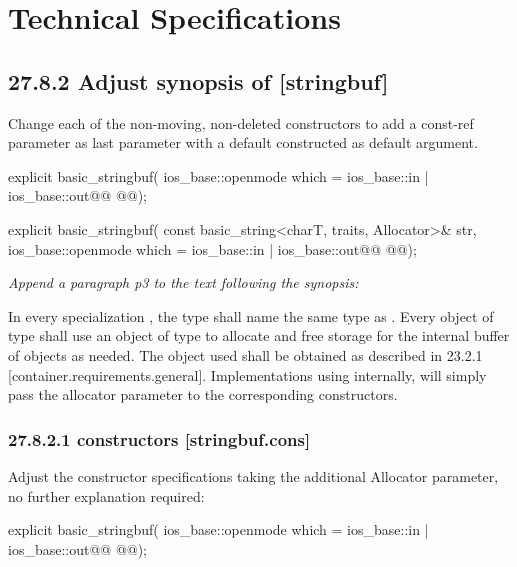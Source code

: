 \documentclass[ebook,11pt,article]{memoir}
\begin{document}
\chapter{Technical Specifications}

\section{27.8.2 Adjust synopsis of  [stringbuf]}
Change each of the non-moving, non-deleted constructors to add a const-ref  parameter as last parameter with a default constructed  as default argument. 
\begin{codeblock}
explicit basic_stringbuf(
        ios_base::openmode which = ios_base::in | ios_base::out@\ins{,}@
        @@);

explicit basic_stringbuf(
        const basic_string<charT, traits, Allocator>& str,
        ios_base::openmode which = ios_base::in | ios_base::out@\ins{,}@
        @@);
\end{codeblock}

\textit{Append a paragraph p3 to the text following the synopsis:}

\begin{insrt}
\pnum
In every specialization , the type  shall name the same type as . Every object of type  shall use an object of type  to allocate and free storage for the internal buffer of  objects as needed. The  object used shall be obtained as described in 23.2.1 [container.requirements.general].
\enternote
Implementations using  internally, will simply pass the allocator parameter to the corresponding  constructors.
\exitnote
\end{insrt}

\subsection{27.8.2.1  constructors [stringbuf.cons]}
Adjust the constructor specifications taking the additional Allocator parameter, no further explanation required:

\begin{itemdecl}
explicit basic_stringbuf(
  ios_base::openmode which = ios_base::in | ios_base::out@\ins{,}@
  @@);
\end{itemdecl}
\end{document}
